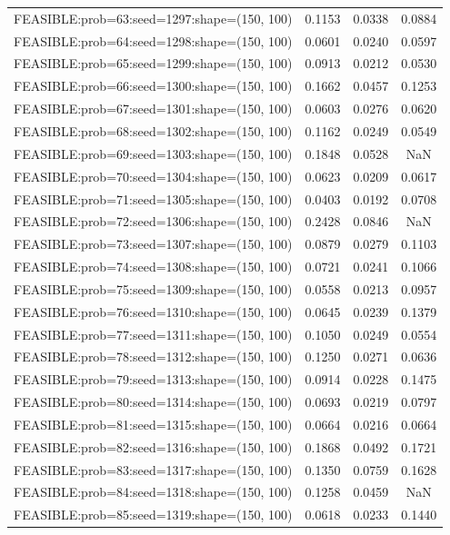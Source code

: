 \begin{longtable}{lccc}
FEASIBLE:prob=63:seed=1297:shape=(150, 100)  & 0.1153 & 0.0338 & 0.0884 \\
FEASIBLE:prob=64:seed=1298:shape=(150, 100)  & 0.0601 & 0.0240 & 0.0597 \\
FEASIBLE:prob=65:seed=1299:shape=(150, 100)  & 0.0913 & 0.0212 & 0.0530 \\
FEASIBLE:prob=66:seed=1300:shape=(150, 100)  & 0.1662 & 0.0457 & 0.1253 \\
FEASIBLE:prob=67:seed=1301:shape=(150, 100)  & 0.0603 & 0.0276 & 0.0620 \\
FEASIBLE:prob=68:seed=1302:shape=(150, 100)  & 0.1162 & 0.0249 & 0.0549 \\
FEASIBLE:prob=69:seed=1303:shape=(150, 100)  & 0.1848 & 0.0528 &    NaN \\
FEASIBLE:prob=70:seed=1304:shape=(150, 100)  & 0.0623 & 0.0209 & 0.0617 \\
FEASIBLE:prob=71:seed=1305:shape=(150, 100)  & 0.0403 & 0.0192 & 0.0708 \\
FEASIBLE:prob=72:seed=1306:shape=(150, 100)  & 0.2428 & 0.0846 &    NaN \\
FEASIBLE:prob=73:seed=1307:shape=(150, 100)  & 0.0879 & 0.0279 & 0.1103 \\
FEASIBLE:prob=74:seed=1308:shape=(150, 100)  & 0.0721 & 0.0241 & 0.1066 \\
FEASIBLE:prob=75:seed=1309:shape=(150, 100)  & 0.0558 & 0.0213 & 0.0957 \\
FEASIBLE:prob=76:seed=1310:shape=(150, 100)  & 0.0645 & 0.0239 & 0.1379 \\
FEASIBLE:prob=77:seed=1311:shape=(150, 100)  & 0.1050 & 0.0249 & 0.0554 \\
FEASIBLE:prob=78:seed=1312:shape=(150, 100)  & 0.1250 & 0.0271 & 0.0636 \\
FEASIBLE:prob=79:seed=1313:shape=(150, 100)  & 0.0914 & 0.0228 & 0.1475 \\
FEASIBLE:prob=80:seed=1314:shape=(150, 100)  & 0.0693 & 0.0219 & 0.0797 \\
FEASIBLE:prob=81:seed=1315:shape=(150, 100)  & 0.0664 & 0.0216 & 0.0664 \\
FEASIBLE:prob=82:seed=1316:shape=(150, 100)  & 0.1868 & 0.0492 & 0.1721 \\
FEASIBLE:prob=83:seed=1317:shape=(150, 100)  & 0.1350 & 0.0759 & 0.1628 \\
FEASIBLE:prob=84:seed=1318:shape=(150, 100)  & 0.1258 & 0.0459 &    NaN \\
FEASIBLE:prob=85:seed=1319:shape=(150, 100)  & 0.0618 & 0.0233 & 0.1440 \\

\end{longtable}
